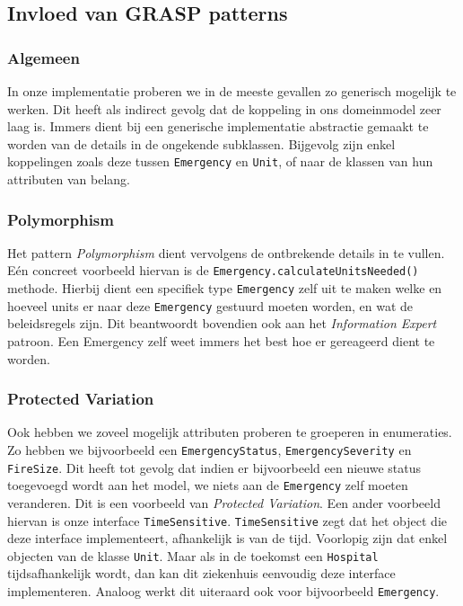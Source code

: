 \label{patterns}
\subsection{Invloed van GRASP patterns}
\label{grasppatterns}
\subsubsection{Algemeen}
In onze implementatie proberen we in de meeste gevallen zo generisch mogelijk te werken. Dit heeft als indirect gevolg dat de koppeling in ons domeinmodel zeer laag is. Immers dient bij een generische implementatie abstractie gemaakt te worden van de details in de ongekende subklassen. Bijgevolg zijn enkel koppelingen zoals deze tussen \texttt{Emergency} en \texttt{Unit}, of naar de klassen van hun attributen van belang.
\subsubsection{Polymorphism}
Het pattern \textit{Polymorphism} dient vervolgens de ontbrekende details in te vullen. E\'en concreet voorbeeld hiervan is de \texttt{Emergency.calculateUnitsNeeded()} methode. Hierbij dient een specifiek type \texttt{Emergency} zelf uit te maken welke en hoeveel units er naar deze \texttt{Emergency} gestuurd moeten worden, en wat de beleidsregels zijn. Dit beantwoordt bovendien ook aan het \textit{Information Expert} patroon. Een Emergency zelf weet immers het best hoe er gereageerd dient te worden.
\subsubsection{Protected Variation}
Ook hebben we zoveel mogelijk attributen proberen te groeperen in enumeraties. Zo hebben we bijvoorbeeld een \texttt{EmergencyStatus}, \texttt{EmergencySeverity} en \texttt{FireSize}. Dit heeft tot gevolg dat indien er bijvoorbeeld een nieuwe status toegevoegd wordt aan het model, we niets aan de \texttt{Emergency} zelf moeten veranderen. Dit is een voorbeeld van \textit{Protected Variation}. Een ander voorbeeld hiervan is onze interface \texttt{TimeSensitive}. \texttt{TimeSensitive} zegt dat het object die deze interface implementeert, afhankelijk is van de tijd. Voorlopig zijn dat enkel objecten van de klasse \texttt{Unit}. Maar als in de toekomst een \texttt{Hospital} tijdsafhankelijk wordt, dan kan dit ziekenhuis eenvoudig deze interface implementeren. Analoog werkt dit uiteraard ook voor bijvoorbeeld \texttt{Emergency}.
